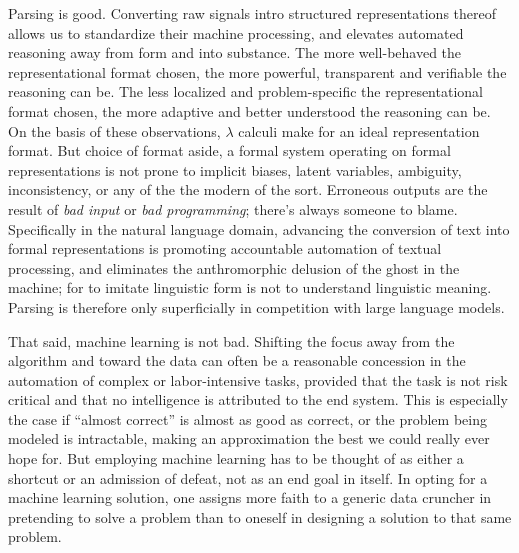 Parsing is good.
Converting raw signals intro structured representations thereof allows us to standardize their machine processing, and elevates automated reasoning away from form and into substance.
The more well-behaved the representational format chosen, the more powerful, transparent and verifiable the reasoning can be.
The less localized and problem-specific the representational format chosen, the more adaptive and better understood the reasoning can be.
On the basis of these observations, $\lambda$ calculi make for an ideal representation format.
But choice of format aside, a formal system operating on formal representations is not prone to implicit biases, latent variables, ambiguity, inconsistency, or any of the the modern  of the sort.
Erroneous outputs are the result of \textit{bad input} or \textit{bad programming}; there's always someone to blame.
Specifically in the natural language domain, advancing the conversion of text into formal representations is promoting accountable automation of textual processing, and eliminates the anthromorphic delusion of the ghost in the machine; for to imitate linguistic form is not to understand linguistic meaning.
Parsing is therefore only superficially in competition with large language models.

That said, machine learning is not bad.
Shifting the focus away from the algorithm and toward the data can often be a reasonable concession in the automation of complex or labor-intensive tasks, provided that the task is not risk critical and that no intelligence is attributed to the end system.
This is especially the case if ``almost correct'' is almost as good as correct, or the problem being modeled is intractable, making an approximation the best we could really ever hope for.
But employing machine learning has to be thought of as either a shortcut or an admission of defeat, not as an end goal in itself.
In opting for a machine learning solution, one assigns more faith to a generic data cruncher in pretending to solve a problem than to oneself in designing a solution to that same problem.

